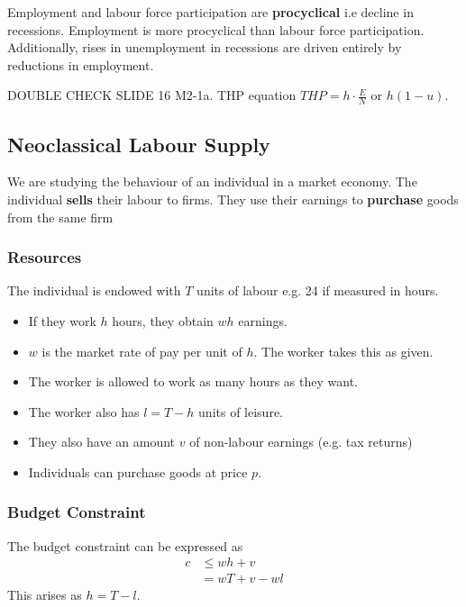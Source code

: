 \documentclass[11pt]{article}
\begin{document}
Employment and labour force participation are \textbf{procyclical} i.e decline in recessions. Employment is more procyclical than labour force participation. Additionally, rises in unemployment in recessions are driven entirely by reductions in employment.

\begin{shaded}
    DOUBLE CHECK SLIDE 16 M2-1a. THP equation $THP = h\cdot\frac{E}{N}$ or $h(1-u).$
\end{shaded}

\subsection{Neoclassical Labour Supply}

We are studying the behaviour of an individual in a market economy. The individual \textbf{sells} their labour to firms. They use their earnings to \textbf{purchase} goods from the same firm

\begin{shaded}
\subsubsection{Resources}
    The individual is endowed with $T$ units of labour e.g. 24 if measured in hours.
    \begin{itemize}
        \item If they work $h$ hours, they obtain $wh$ earnings.
        \item $w$ is the market rate of pay per unit of $h$. The worker takes this as given.
        \item The worker is allowed to work as many hours as they want.
        \item The worker also has $l=T-h$ units of leisure.
        \item They also have an amount $v$ of non-labour earnings (e.g. tax returns)
        \item Individuals can purchase goods at price $p$.
    \end{itemize}
\end{shaded}

\subsubsection{Budget Constraint}

The budget constraint can be expressed as 
\begin{equation}
\label{labour supply bc}
\begin{aligned}
    c &\leq wh + v\\
    &= wT + v - wl
\end{aligned}
\end{equation}
This arises as $h = T-l$.
\end{document}
